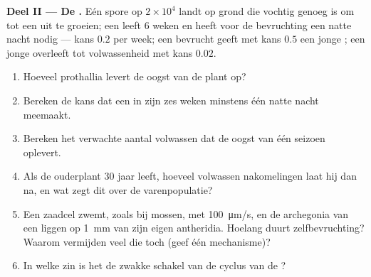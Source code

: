\begin{problem}
\medskip
\noindent\textbf{Deel II --- De .}
Eén spore op $2\times 10^{4}$ landt op grond die vochtig genoeg is om tot
een  uit te groeien; een  leeft \num{6} weken en
heeft voor de bevruchting een natte nacht nodig --- kans $0.2$ per week;
een bevrucht  geeft met kans
$0.5$ een jonge ; een jonge  overleeft tot volwassenheid
met kans
$0.02$.
\begin{enumerate}[resume]
  \item Hoeveel prothallia levert de oogst van de plant op?
  \item Bereken de kans dat een  in zijn zes weken minstens
        één natte nacht meemaakt.
  \item Bereken het verwachte aantal volwassen  dat de oogst van
        één seizoen oplevert.
  \item Als de ouderplant \num{30} jaar leeft, hoeveel volwassen
        nakomelingen laat hij dan na, en wat zegt dit over de
        varenpopulatie?
  \item Een zaadcel zwemt, zoals bij mossen, met \qty{100}{\micro m/s},
        en de archegonia van een  liggen op \qty{1}{mm} van
        zijn eigen antheridia. Hoelang duurt zelfbevruchting? Waarom
        vermijden veel  die toch (geef één mechanisme)?
  \item In welke zin is het  de zwakke schakel van de cyclus
        van de ?
\end{enumerate}


\end{problem}
